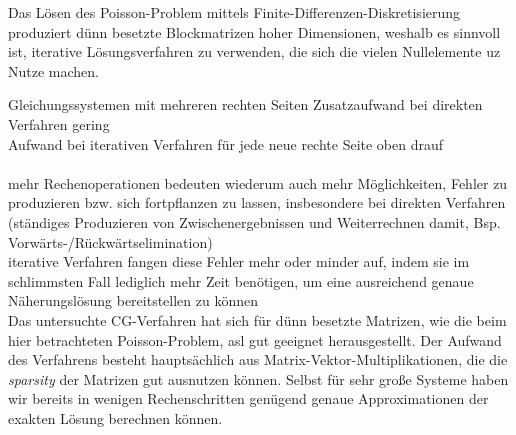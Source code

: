 \documentclass{scrartcl}
\begin{document}
Das Lösen des Poisson-Problem mittels Finite-Differenzen-Diskretisierung produziert dünn besetzte Blockmatrizen hoher Dimensionen, weshalb es sinnvoll ist, iterative Lösungsverfahren zu verwenden, die sich die vielen Nullelemente uz Nutze machen.

Gleichungssystemen mit mehreren rechten Seiten Zusatzaufwand bei direkten Verfahren gering \\
Aufwand bei iterativen Verfahren für jede neue rechte Seite oben drauf \\
\\
mehr Rechenoperationen bedeuten wiederum auch mehr Möglichkeiten, Fehler zu produzieren bzw. sich fortpflanzen zu lassen, insbesondere bei direkten Verfahren (ständiges Produzieren von Zwischenergebnissen und Weiterrechnen damit, Bsp. Vorwärts-/Rückwärtselimination) \\
iterative Verfahren fangen diese Fehler mehr oder minder auf, indem sie im schlimmsten Fall lediglich mehr Zeit benötigen, um eine ausreichend genaue Näherungslösung bereitstellen zu können \\

Das untersuchte CG-Verfahren hat sich für dünn besetzte Matrizen, wie die beim hier betrachteten Poisson-Problem, asl gut geeignet herausgestellt.
Der Aufwand des Verfahrens besteht hauptsächlich aus Matrix-Vektor-Multiplikationen, die die \textit{sparsity} der Matrizen gut ausnutzen können.
Selbst für sehr große Systeme haben wir bereits in wenigen Rechenschritten genügend genaue Approximationen der exakten Lösung berechnen können. 


\pagebreak


\end{document}
